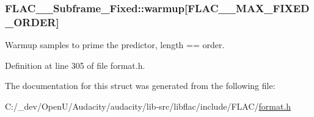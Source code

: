 \subsubsection[{\texorpdfstring{warmup}{warmup}}]{ F\+L\+A\+C\+\_\+\+\_\+\+Subframe\+\_\+\+Fixed\+::warmup\mbox{[}{\bf F\+L\+A\+C\+\_\+\+\_\+\+M\+A\+X\+\_\+\+F\+I\+X\+E\+D\+\_\+\+O\+R\+D\+ER}\mbox{]}}\hypertarget{struct_f_l_a_c_____subframe___fixed_a0e9a40fb89b8aa45f83bf8979d200f1f}{}\label{struct_f_l_a_c_____subframe___fixed_a0e9a40fb89b8aa45f83bf8979d200f1f}
Warmup samples to prime the predictor, length == order. 

Definition at line 305 of file format.\+h.



The documentation for this struct was generated from the following file\+:\begin{DoxyCompactItemize}
\item 
C\+:/\+\_\+dev/\+Open\+U/\+Audacity/audacity/lib-\/src/libflac/include/\+F\+L\+A\+C/\hyperlink{include_2_f_l_a_c_2format_8h}{format.\+h}\end{DoxyCompactItemize}

